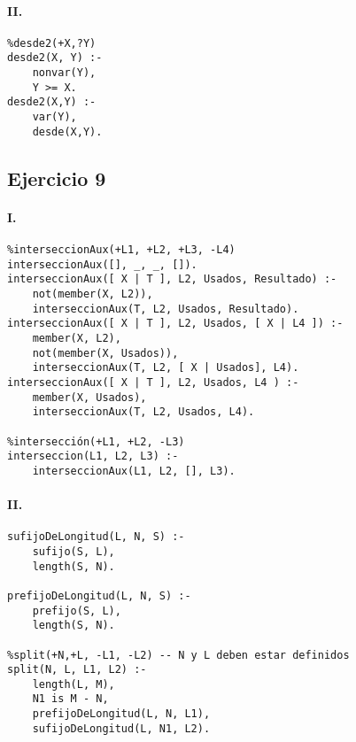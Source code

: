 \documentclass[10pt,a4paper]{article}
\begin{document}
\paragraph{II.}
\begin{centrado}
\begin{verbatim}
%desde2(+X,?Y)
desde2(X, Y) :- 
	nonvar(Y),
	Y >= X.
desde2(X,Y) :-
	var(Y),
	desde(X,Y).
\end{verbatim}
\end{centrado}

\newpage
\subsection{Ejercicio 9}
\paragraph{I.}
\begin{centrado}
\begin{verbatim}
%interseccionAux(+L1, +L2, +L3, -L4)
interseccionAux([], _, _, []).
interseccionAux([ X | T ], L2, Usados, Resultado) :-
	not(member(X, L2)),
	interseccionAux(T, L2, Usados, Resultado).
interseccionAux([ X | T ], L2, Usados, [ X | L4 ]) :-
	member(X, L2),
	not(member(X, Usados)),
	interseccionAux(T, L2, [ X | Usados], L4).
interseccionAux([ X | T ], L2, Usados, L4 ) :-
	member(X, Usados),
	interseccionAux(T, L2, Usados, L4).

%intersección(+L1, +L2, -L3)
interseccion(L1, L2, L3) :-
	interseccionAux(L1, L2, [], L3).

\end{verbatim}
\end{centrado}

\paragraph{II.}
\begin{centrado}
\begin{verbatim}
sufijoDeLongitud(L, N, S) :-
	sufijo(S, L),
	length(S, N).

prefijoDeLongitud(L, N, S) :-
	prefijo(S, L),
	length(S, N).

%split(+N,+L, -L1, -L2) -- N y L deben estar definidos
split(N, L, L1, L2) :-
	length(L, M),
	N1 is M - N,
	prefijoDeLongitud(L, N, L1),
	sufijoDeLongitud(L, N1, L2).

\end{verbatim}
\end{centrado}
\end{document}
